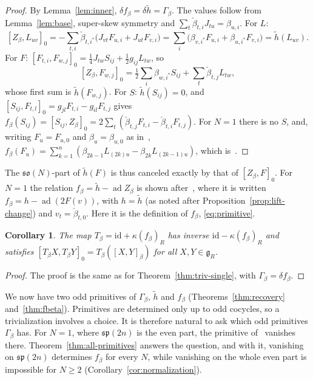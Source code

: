 \documentclass[11pt]{article}
\numberwithin{equation}{section}
\newtheorem{corollary}[theorem]{Corollary}
\theoremstyle{definition}
\theoremstyle{remark}
\newcommand{\ad}{\operatorname{ad}}
\begin{document}
\begin{proof}
By Lemma~\ref{lem:inner}, $\delta f_\beta=\delta\tilde h=\Gamma_\beta$. The values follow from
Lemma~\ref{lem:base}, super-skew symmetry and $\sum_t\check\beta_{t,i}J_{tu}=\beta_{u,i}$. For $L$:
\[
 [Z_\beta,L_{uv}]_0=-\sum_{t,i}\check\beta_{t,i^*}\bigl(J_{vt}F_{u,i}+J_{ut}F_{v,i}\bigr)
 =\sum_i\bigl(\beta_{v,i^*}F_{u,i}+\beta_{u,i^*}F_{v,i}\bigr)=\tilde h(L_{uv}).
\]
For $F$: $[F_{t,i},F_{w,j}]_0=\tfrac14J_{tw}S_{ij}+\tfrac12g_{ij}L_{tw}$, so
\[
 [Z_\beta,F_{w,j}]_0=\tfrac12\sum_i\beta_{w,i^*}S_{ij}+\sum_t\check\beta_{t,j}L_{tw},
\]
whose first sum is $\tilde h(F_{w,j})$. For $S$: $\tilde h(S_{ij})=0$, and
$[S_{ij},F_{t,l}]_0=g_{jl}F_{t,i}-g_{il}F_{t,j}$ gives
$f_\beta(S_{ij})=[S_{ij},Z_\beta]_0=2\sum_t(\check\beta_{t,j}F_{t,i}-\check\beta_{t,i}F_{t,j})$. For $N=1$
there is no $S$, and, writing $F_u=F_{u,0}$ and $\beta_u=\beta_{u,0}$ as in~\cite{Aoi26},
$f_\beta(F_u)=\sum_{k=1}^n(\beta_{2k-1}L_{(2k)u}-\beta_{2k}L_{(2k-1)u})$, which is~\cite[(4.2)]{Aoi26}.
\end{proof}

The $\mathfrak{so}(N)$-part of $\tilde h(F)$ is thus canceled exactly by that of
$[Z_\beta,F]_0$. For $N=1$ the relation $f_\beta=\tilde h-\ad Z_\beta$ is shown
after~\cite[Theorem~4.1]{Aoi26}, where it is written $f_\beta=h-\ad(2F(v))$, with $h=\tilde h$ (as noted after Proposition~\ref{prop:lift-change}) and $v_t=\check\beta_{t,0}$. Here it is the definition of $f_\beta$, \eqref{eq:primitive}.

\begin{corollary}\label{cor:tbeta}
The map $T_\beta=\mathrm{id}+\kappa(f_\beta)_R$ has inverse $\mathrm{id}-\kappa(f_\beta)_R$ and
satisfies $[T_\beta X,T_\beta Y]_0=T_\beta([X,Y]_\beta)$ for all $X,Y\in\mathfrak g_R$.
\end{corollary}

\begin{proof}
The proof is the same as for Theorem~\ref{thm:triv-single}, with $\Gamma_\beta=\delta f_\beta$.
\end{proof}

We now have two odd primitives of $\Gamma_\beta$, $\tilde h$ and $f_\beta$ (Theorems~\ref{thm:recovery} and~\ref{thm:fbeta}). Primitives are determined only up to odd cocycles, so a trivialization
involves a choice. It is therefore natural to ask which odd primitives $\Gamma_\beta$ has. For $N=1$, where $\mathfrak{sp}(2n)$ is the even part, the
primitive of~\cite{Aoi26} vanishes there. Theorem~\ref{thm:all-primitives} answers the question,
and with it, vanishing on $\mathfrak{sp}(2n)$ determines $f_\beta$ for every $N$, while vanishing on
the whole even part is impossible for $N\geq2$ (Corollary~\ref{cor:normalization}).
\end{document}
